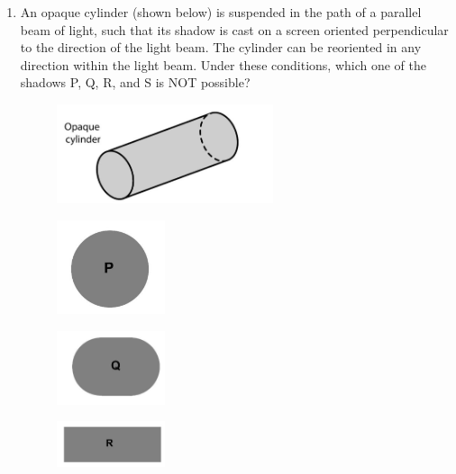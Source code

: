 \documentclass[journal]{IEEEtran}
\begin{document}
\begin{enumerate}
    \item An opaque cylinder (shown below) is suspended in the path of a parallel beam of light, such that its shadow is cast on a screen oriented perpendicular to the direction of the light beam. The cylinder can be reoriented in any direction within the light beam. Under these conditions, which one of the shadows P, Q, R, and S is NOT possible?
        \begin{multicols}{2}
        \begin{figure}[H]
    \centering
      \includegraphics[width=0.6\textwidth]{10.png} 
      \caption{}
    \label{fig:fig10} 
\end{figure}
    \begin{figure}[H]
      \includegraphics[width=0.3\textwidth]{11.png} 
      \caption{}
    \label{fig:fig11} 
\end{figure}
\begin{figure}[H]
      \includegraphics[width=0.3\textwidth]{12.png} 
      \caption{}
    \label{fig:fig12} 
\end{figure}
\begin{figure}[H]
      \includegraphics[width=0.3\textwidth]{13.png} 
      \caption{}
    \label{fig:fig13} 
\end{figure}

\end{multicols}
\end{enumerate}
\end{document}

